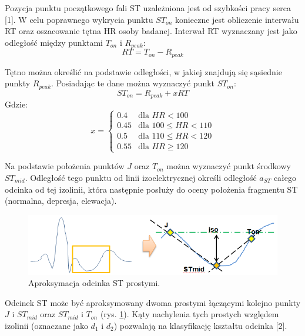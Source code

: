 Pozycja punktu początkowego fali ST uzależniona jest od szybkości pracy serca [1]. W celu poprawnego wykrycia punktu $ ST_{on} $ konieczne jest obliczenie interwału RT oraz oszacowanie tętna HR osoby badanej. Interwał RT wyznaczany jest jako odległość między punktami $ T_{on} $ i $ R_{peak} $:
\begin{equation}
	RT = T_{on} - R_{peak}
\end{equation}

Tętno można określić na podstawie odległości, w jakiej znajdują się sąsiednie punkty $ R_{peak} $. Posiadając te dane można wyznaczyć punkt $ ST_{on} $:
\begin{equation}
	ST_{on} = R_{peak} + xRT
\end{equation}
Gdzie:
\begin{equation}
	x = 
	\begin{cases}
	0.4		& \text{dla } HR < 100 \\
	0.45	& \text{dla } 100 \leq HR < 110 \\
	0.5		& \text{dla } 110 \leq HR < 120 \\
	0.55	& \text{dla } HR \geq 120
	\end{cases}
\end{equation}

Na podstawie położenia punktów $ J $ oraz $ T_{on} $ można wyznaczyć punkt środkowy $ ST_{mid} $. Odległość tego punktu od linii izoelektrycznej określi odległość $ a_{ST} $ całego odcinka od tej izolinii, która następnie posłuży do oceny położenia fragmentu ST (normalna, depresja, elewacja).
\begin{figure}[H]
	\centering
	\includegraphics[width=1\textwidth]{ST_INTERVAL/img/ST_aproksymacjaST.png}
	\caption{Aproksymacja odcinka ST prostymi.}
	\label{fig:ST_aproksymacjaST}
\end{figure}
Odcinek ST może być aproksymowany dwoma prostymi łączącymi kolejno punkty $ J $ i $ ST_{mid} $ oraz $ ST_{mid} $ i $ T_{on} $ (rys. \ref{fig:ST_aproksymacjaST}). Kąty nachylenia tych prostych względem izolinii (oznaczane jako $ d_1 $ i $ d_2 $) pozwalają na klasyfikację kształtu odcinka [2].

